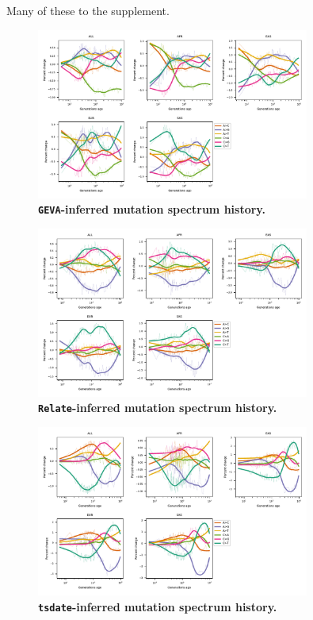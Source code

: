 \documentclass[]{article}
\newcommand{\GEVA}{\texttt{GEVA}\xspace}
\newcommand{\tsdate}{\texttt{tsdate}\xspace}
\newcommand{\relate}{\texttt{Relate}\xspace}
\begin{document}
Many of these to the supplement.

\begin{figure}[ht!]
    \centering
    \includegraphics[width=0.8\textwidth]{../plots/spectrum_history.geva.max_age.10000.pdf}
    \caption{
        \textbf{\GEVA-inferred mutation spectrum history.}
    }
    \label{fig:geva-spectra}
\end{figure}


\begin{figure}[ht!]
    \centering
    \includegraphics[width=0.8\textwidth]{../plots/spectrum_history.relate.max_age.10000.pdf}
    \caption{
        \textbf{\relate-inferred mutation spectrum history.}
    }
    \label{fig:relate-spectra}
\end{figure}


\begin{figure}[ht!]
    \centering
    \includegraphics[width=0.8\textwidth]{../plots/spectrum_history.tsdate.max_age.10000.pdf}
    \caption{
        \textbf{\tsdate-inferred mutation spectrum history.}
    }
    \label{fig:tsdate-spectra}
\end{figure}
\end{document}
